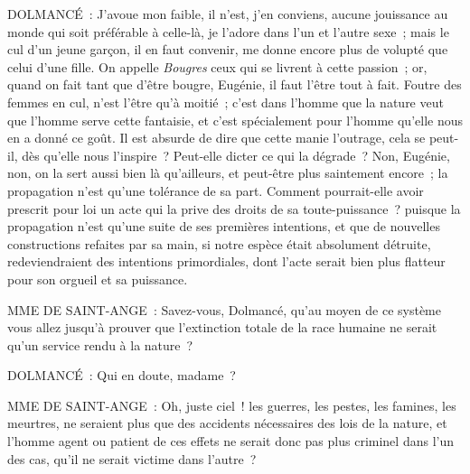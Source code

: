 \documentclass[french,twoside]{book} %
\begin{document}
DOLMANCÉ : J’avoue mon faible, il n’est, j’en conviens, aucune jouissance au monde qui soit préférable à celle-là, je l’adore dans l’un et l’autre sexe ; mais le cul d’un jeune garçon, il en faut convenir, me donne encore plus de volupté que celui d’une fille. On appelle {\itshape Bougres} ceux qui se livrent à cette passion ; or, quand on fait tant que d’être bougre, Eugénie, il faut l’être tout à fait. Foutre des femmes en cul, n’est l’être qu’à moitié ; c’est dans l’homme que la nature veut que l’homme serve cette fantaisie, et c’est spécialement pour l’homme qu’elle nous en a donné ce goût. Il est absurde de dire que cette manie l’outrage, cela se peut-il, dès qu’elle nous l’inspire ? Peut-elle dicter ce qui la dégrade ? Non, Eugénie, non, on la sert aussi bien là qu’ailleurs, et peut-être plus saintement encore ; la propagation n’est qu’une tolérance de sa part. Comment pourrait-elle avoir prescrit pour loi un acte qui la prive des droits de sa toute-puissance ? puisque la propagation n’est qu’une suite de ses premières intentions, et que de nouvelles constructions refaites par sa main, si notre espèce était absolument détruite, redeviendraient des intentions primordiales, dont l’acte serait bien plus flatteur pour son orgueil et sa puissance.\par
MME DE SAINT-ANGE : Savez-vous, Dolmancé, qu’au moyen de ce système vous allez jusqu’à prouver que l’extinction totale de la race humaine ne serait qu’un service rendu à la nature ?\par
DOLMANCÉ : Qui en doute, madame ?\par
MME DE SAINT-ANGE : Oh, juste ciel ! les guerres, les pestes, les famines, les meurtres, ne seraient plus que des accidents nécessaires des lois de la nature, et l’homme agent ou patient de ces effets ne serait donc pas plus criminel dans l’un des cas, qu’il ne serait victime dans l’autre ?\par
\end{document}

